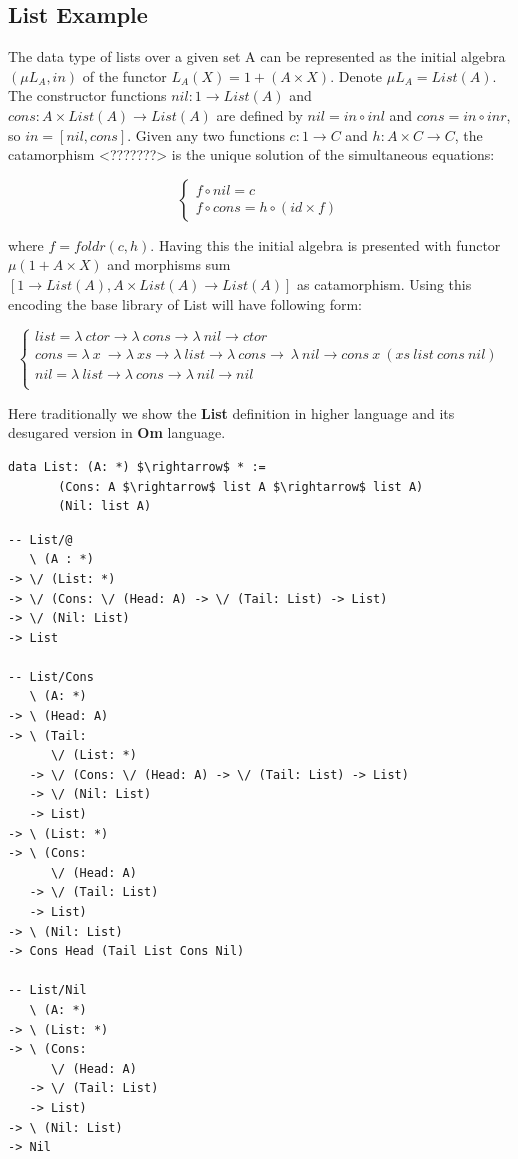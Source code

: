 \documentclass{aip-cp}
\begin{document}
\subsection{List Example}
The data type of lists over a given set A can be represented as the initial algebra
$(\mu L_A, in)$ of the functor $L_A(X) = 1 + (A \times X)$. Denote $\mu L_A = List(A)$.
The constructor functions $nil: 1 \rightarrow List(A)$ and
$cons: A \times List(A) \rightarrow List(A)$ are defined by
$nil = in \circ inl$ and $cons = in \circ inr$, so $in = [nil,cons]$.
Given any two functions $c: 1 \rightarrow C$ and $h: A \times C \rightarrow C$,
the catamorphism <???????>
is the unique solution of the simultaneous equations:

$$
\begin{cases}
  f \circ nil  = c \\
  f \circ cons = h \circ (id \times f)
\end{cases}
$$

where $f = foldr(c,h)$.
Having this the initial algebra is presented with functor
$\mu (1 + A \times X)$ and morphisms sum $[1 \rightarrow List(A), A \times List(A) \rightarrow List(A)]$
as catamorphism.
Using this encoding the base library of List will have following form:

$$
\begin{cases}
list = \lambda\ ctor \rightarrow \lambda\ cons \rightarrow \lambda\ nil \rightarrow ctor\\
cons = \lambda\ x\ \rightarrow \lambda\ xs \rightarrow \lambda\ list \rightarrow \lambda\ cons \rightarrow\ \lambda\ nil \rightarrow cons\ x\ (xs\ list\ cons\ nil)\\
nil = \lambda\ list \rightarrow \lambda\ cons \rightarrow \lambda\ nil \rightarrow nil\\
\end{cases}
$$

Here traditionally we show the {\bf List} definition in higher language and its desugared version in {\bf Om} language.

\begin{lstlisting}[mathescape=true]
  data List: (A: *) $\rightarrow$ * :=
       (Cons: A $\rightarrow$ list A $\rightarrow$ list A)
       (Nil: list A)
\end{lstlisting}

\begin{lstlisting}[mathescape=true]
-- List/@
   \ (A : *)
-> \/ (List: *)
-> \/ (Cons: \/ (Head: A) -> \/ (Tail: List) -> List)
-> \/ (Nil: List)
-> List

-- List/Cons
   \ (A: *)
-> \ (Head: A)
-> \ (Tail:
      \/ (List: *)
   -> \/ (Cons: \/ (Head: A) -> \/ (Tail: List) -> List)
   -> \/ (Nil: List)
   -> List)
-> \ (List: *)
-> \ (Cons:
      \/ (Head: A)
   -> \/ (Tail: List)
   -> List)
-> \ (Nil: List)
-> Cons Head (Tail List Cons Nil)

-- List/Nil
   \ (A: *)
-> \ (List: *)
-> \ (Cons:
      \/ (Head: A)
   -> \/ (Tail: List)
   -> List)
-> \ (Nil: List)
-> Nil
\end{lstlisting}
\end{document}

